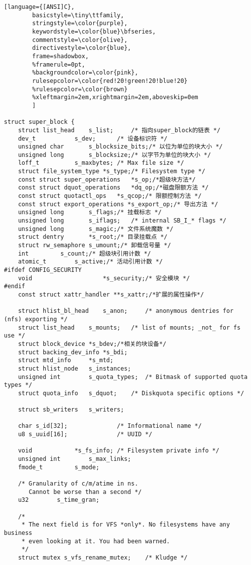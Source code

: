 \begin{lstlisting}[language={[ANSI]C},
        basicstyle=\tiny\ttfamily,
        stringstyle=\color{purple},
        keywordstyle=\color{blue}\bfseries,
        commentstyle=\color{olive},
        directivestyle=\color{blue},
        frame=shadowbox,
        %framerule=0pt,
        %backgroundcolor=\color{pink},
        rulesepcolor=\color{red!20!green!20!blue!20}
        %rulesepcolor=\color{brown}
        %xleftmargin=2em,xrightmargin=2em,aboveskip=0em
        ]
        
struct super_block {
	struct list_head	s_list;		/* 指向super_block的链表 */
	dev_t			s_dev;		/* 设备标识符 */
	unsigned char		s_blocksize_bits;/* 以位为单位的块大小 */
	unsigned long		s_blocksize;/* 以字节为单位的块大小 */
	loff_t			s_maxbytes;	/* Max file size */
	struct file_system_type	*s_type;/* Filesystem type */
	const struct super_operations	*s_op;/*超级块方法*/
	const struct dquot_operations	*dq_op;/*磁盘限额方法 */
	const struct quotactl_ops	*s_qcop;/* 限额控制方法 */
	const struct export_operations *s_export_op;/* 导出方法 */
	unsigned long		s_flags;/* 挂载标志 */
	unsigned long		s_iflags;	/* internal SB_I_* flags */
	unsigned long		s_magic;/* 文件系统魔数 */
	struct dentry		*s_root;/* 目录挂载点 */
	struct rw_semaphore	s_umount;/* 卸载信号量 */
	int			s_count;/* 超级块引用计数 */
	atomic_t		s_active;/* 活动引用计数 */
#ifdef CONFIG_SECURITY
	void                    *s_security;/* 安全模块 */
#endif
	const struct xattr_handler **s_xattr;/*扩展的属性操作*/

	struct hlist_bl_head	s_anon;		/* anonymous dentries for (nfs) exporting */
	struct list_head	s_mounts;	/* list of mounts; _not_ for fs use */
	struct block_device	*s_bdev;/*相关的块设备*/
	struct backing_dev_info *s_bdi;
	struct mtd_info		*s_mtd;
	struct hlist_node	s_instances;
	unsigned int		s_quota_types;	/* Bitmask of supported quota types */
	struct quota_info	s_dquot;	/* Diskquota specific options */

	struct sb_writers	s_writers;

	char s_id[32];				/* Informational name */
	u8 s_uuid[16];				/* UUID */

	void 			*s_fs_info;	/* Filesystem private info */
	unsigned int		s_max_links;
	fmode_t			s_mode;

	/* Granularity of c/m/atime in ns.
	   Cannot be worse than a second */
	u32		   s_time_gran;

	/*
	 * The next field is for VFS *only*. No filesystems have any business
	 * even looking at it. You had been warned.
	 */
	struct mutex s_vfs_rename_mutex;	/* Kludge */


\end{lstlisting}
